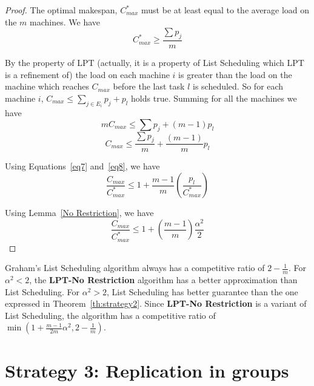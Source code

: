 \documentclass[10pt, conference, compsocconf]{IEEEtran}
\begin{document}
\begin{proof}
  The optimal makespan, $C_{max}^{*}$ must be at least equal to the
  average load on the $m$ machines. We have
  \begin{equation}\label{eq7}
    C_{max}^{*}\geq\frac{\sum p_j}{m}
  \end{equation}

  By the property of LPT (actually, it is a property of List
  Scheduling which LPT is a refinement of) the load on each machine
  $i$ is greater than the load on the machine which reaches $C_{max}$
  before the last task $l$ is scheduled. So for each machine $i$,
  $C_{max} \leq \sum_{j \in E_i}^{}{p_j} + p_l$ holds true.  Summing
  for all the machines we have
  \begin{equation}\nonumber
    mC_{max} \leq  \sum {p_j} + (m-1)p_l
  \end{equation}
  \begin{equation}\label{eq8}
    C_{max} \leq  \frac{\sum {p_j}}{m} + \frac{(m-1)}{m}p_l
  \end{equation}
  
  Using Equations~\ref{eq7} and~\ref{eq8}, we have
  \begin{equation}\nonumber
    \frac{C_{max}}{C_{max}^{*}} \leq 1 + {\frac{m-1}{m}}\left(\frac{p_l}{C_{max}^{*}}\right)
  \end{equation}
  
  Using Lemma~\ref{No Restriction}, we have 
  \begin{equation}\nonumber
    \frac{C_{max}}{C_{max}^{*}} \leq 1 + \left(\frac{m-1}{m}\right)\frac{\alpha^{2}}{2}
  \end{equation}

\end{proof}  

Graham's List Scheduling algorithm always has a competitive ratio
of $2-\frac{1}{m}$. For $\alpha^2 < 2$, the \textbf{LPT-No
  Restriction} algorithm has a better approximation than List
Scheduling. For $\alpha^2 > 2$, List Scheduling has better guarantee
than the one expressed in Theorem~\ref{th:strategy2}. Since
\textbf{LPT-No Restriction} is a variant of List Scheduling,
the algorithm has a competitive ratio of $\min (1 +
\frac{m-1}{2m}\alpha^{2}, 2-\frac{1}{m})$.



\section{Strategy 3: Replication in groups}\label{sec6}
\end{document}
